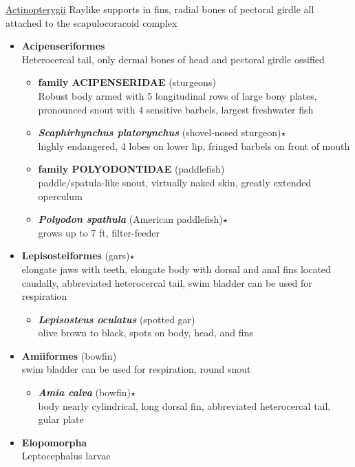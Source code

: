 \documentclass[a4paper,12pt]{article}
\begin{document}
\begin{description}
\item{\underline{{\LARGE{Actinopterygii}}}}
Raylike supports in fins, radial bones of pectoral girdle all attached to the scapulocoracoid complex
\begin{itemize}
  \item{\textbf{Acipenseriformes}} \\ Heterocercal tail, only dermal bones of head and pectoral girdle ossified
  \begin{itemize}
    \item{\textbf{family ACIPENSERIDAE} (sturgeons)} \\ Robust body armed with 5 longitudinal rows of large bony plates, pronounced snout with 4 sensitive barbels, largest freshwater fish
      \item{\textbf{\textit{   Scaphirhynchus platorynchus}} (shovel-nosed sturgeon)$\star$} \\ highly endangered, 4 lobes on lower lip, fringed barbels on front of mouth
    \item{\textbf{family POLYODONTIDAE} (paddlefish)} \\ paddle/spatula-like snout, virtually naked skin, greatly extended operculum
      \item{\textbf{\textit{   Polyodon spathula}} (American paddlefish)$\star$} \\ grows up to 7 ft, filter-feeder
  \end{itemize}
  \item{\textbf{Lepisosteiformes} (gars)$\star$} \\ elongate jaws with teeth, elongate body with dorsal and anal fins located caudally, abbreviated heterocercal tail, swim bladder can be used for respiration
  \begin{itemize}
    \item{\textbf{\textit{   Lepisosteus oculatus}} (spotted gar)} \\ olive brown to black, spots on body, head, and fins
  \end{itemize}
  \item{\textbf{Amiiformes} (bowfin)} \\ swim bladder can be used for respiration, round snout
  \begin{itemize}
    \item{\textbf{\textit{   Amia calva}} (bowfin)$\star$} \\ body nearly cylindrical, long dorsal fin, abbreviated heterocercal tail, gular plate
  \end{itemize}
  \item{\textbf{Elopomorpha}} \\ Leptocephalus larvae

\end{itemize}
\end{description}
\end{document}

